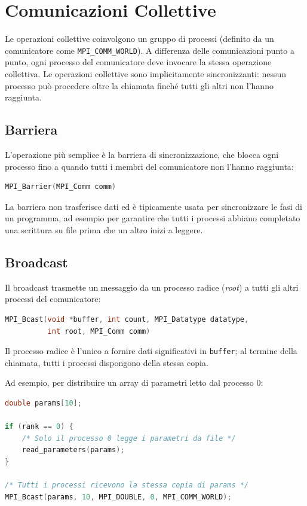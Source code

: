 \section{Comunicazioni Collettive}
Le operazioni collettive coinvolgono un gruppo di processi (definito da un comunicatore come \texttt{MPI\_COMM\_WORLD}).
A differenza delle comunicazioni punto a punto, ogni processo del comunicatore deve invocare la stessa operazione collettiva. Le operazioni collettive sono implicitamente sincronizzanti: nessun processo può procedere oltre la chiamata finché tutti gli altri non l'hanno raggiunta.

\subsection{Barriera}
L'operazione più semplice è la barriera di sincronizzazione, che blocca ogni processo fino a quando tutti i membri del comunicatore non l'hanno raggiunta:
\begin{lstlisting}[language=C, numbers=none]
MPI_Barrier(MPI_Comm comm)
\end{lstlisting}
La barriera non trasferisce dati ed è tipicamente usata per sincronizzare le fasi di un programma, ad esempio per garantire che tutti i processi abbiano completato una scrittura su file prima che un altro inizi a leggere.

\subsection{Broadcast}
Il broadcast trasmette un messaggio da un processo radice (\emph{root}) a tutti gli altri processi del comunicatore:
\begin{lstlisting}[language=C, numbers=none]
MPI_Bcast(void *buffer, int count, MPI_Datatype datatype,
          int root, MPI_Comm comm)
\end{lstlisting}
Il processo radice è l'unico a fornire dati significativi in \texttt{buffer}; al termine della chiamata, tutti i processi dispongono della stessa copia.

Ad esempio, per distribuire un array di parametri letto dal processo 0:
\begin{lstlisting}[language=C, numbers=none]
double params[10];

if (rank == 0) {
    /* Solo il processo 0 legge i parametri da file */
    read_parameters(params);
}

/* Tutti i processi ricevono la stessa copia di params */
MPI_Bcast(params, 10, MPI_DOUBLE, 0, MPI_COMM_WORLD);
\end{lstlisting}

